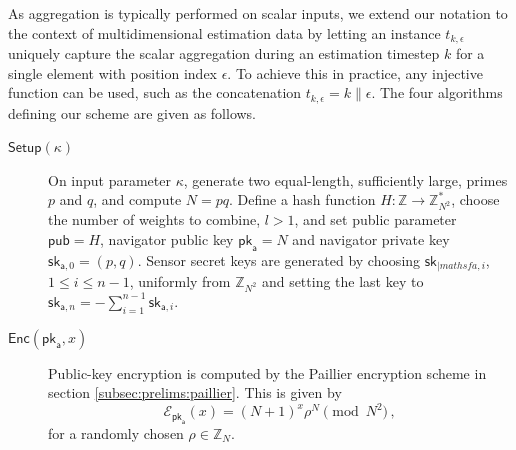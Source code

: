 As aggregation is typically performed on scalar inputs, we extend our notation to the context of multidimensional estimation data by letting an instance $t_{k,\epsilon}$ uniquely capture the scalar aggregation during an estimation timestep $k$ for a single element with position index $\epsilon$. To achieve this in practice, any injective function can be used, such as the concatenation $t_{k,\epsilon}=k\mathbin\|\epsilon$. The four algorithms defining our scheme are given as follows.
\begin{description}
    \item[$\mathsf{Setup}(\kappa)$] On input parameter $\kappa$, generate two equal-length, sufficiently large, primes $p$ and $q$, and compute $N=pq$. Define a hash function $H:\mathbb{Z} \rightarrow \mathbb{Z}_{N^2}^*$, choose the number of weights to combine, $l>1$, and set public parameter $\mathsf{pub}=H$, navigator public key $\mathsf{pk}_{\mathsf{a}} = N$ and navigator private key $\mathsf{sk}_{\mathsf{a},0}=(p,q)$. Sensor secret keys are generated by choosing $\mathsf{sk}_{|mathsf{a},i}$, $1\leq i\leq n-1$, uniformly from $\mathbb{Z}_{N^2}$ and setting the last key to $\mathsf{sk}_{\mathsf{a},n} = -\sum^{n-1}_{i=1}\mathsf{sk}_{\mathsf{a},i}$.
 
    \item[$\mathsf{Enc}(\mathsf{pk}_{\mathsf{a}}, x)$] Public-key encryption is computed by the Paillier encryption scheme in section \ref{subsec:prelims:paillier}. This is given by
    \begin{equation}\label{eq:nonlin_fusion:lca_scheme_encryption}
        \mathcal{E}_{\mathsf{pk}_{\mathsf{a}}}(x) = (N+1)^{x}\rho^N \pmod{N^2}\,,
    \end{equation}
    for a randomly chosen $\rho \in \mathbb{Z}_N$.


\end{description}
